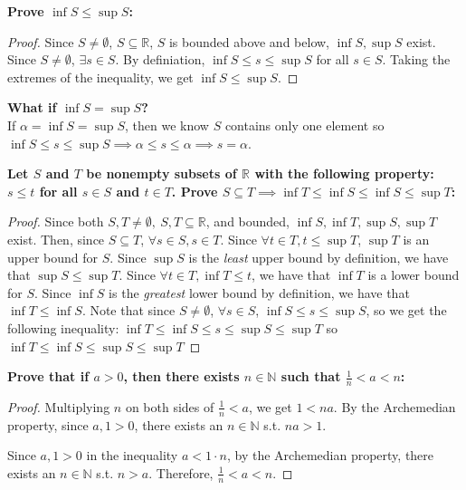 \documentclass[13pt]{letter}
\begin{document}
\textbf{Prove $\inf{S} \leq \sup{S}$:}
\begin{proof}
  Since $S \neq \emptyset$, $S \subseteq
  \mathbb{R}$, $S$ is bounded above and below, $\inf{S}, \sup{S}$
  exist. Since $S \neq \emptyset$, $\exists s \in S$. By definiation,
  $\inf{S} \leq s \leq \sup{S}$ for all $s \in S$. Taking the extremes of the
  inequality, we get $\inf{S} \leq \sup{S}$.
\end{proof}
\textbf{What if $\inf{S} = \sup{S}$?} \\
If $\alpha = \inf{S} = \sup{S}$, then we know $S$ contains only one
element so $\inf{S} \leq s \leq \sup{S} \implies \alpha \leq s \leq
\alpha \implies s = \alpha$. 

\textbf{Let $S$ and $T$ be nonempty subsets of $\mathbb{R}$ with the
  following property: $s \leq t$ for all $s \in S$ and $t \in
  T$. Prove $S \subseteq T \implies \inf{T} \leq \inf{S} \leq \inf{S} \leq \sup{T}$:}
\begin{proof}
  Since both $S, T \neq \emptyset, \ S, T \subseteq \mathbb{R}$, and
  bounded, $\inf{S}, \inf{T}, \sup{S}, \sup{T}$ exist. Then, since $S
  \subseteq T$, $\forall s \in S, s \in T$. Since $\forall t \in T, t
  \leq \sup{T}$, $\sup{T}$ is an upper bound for $S$. Since $\sup{S}$
  is the \textit{least} upper bound by definition, we have that
  $\sup{S} \leq \sup{T}$. Since $\forall t \in T, \inf{T} \leq t$, we
  have that $\inf{T}$ is a lower bound for $S$. Since $\inf{S}$ is the
  \textit{greatest} lower bound by definition, we have that $\inf{T}
  \leq \inf{S}$. Note that since $S \neq \emptyset$, $\forall s \in
  S$, $\inf{S} \leq s \leq \sup{S}$, so we get the following
  inequality: $\inf{T} \leq \inf{S} \leq s \leq \sup{S} \leq \sup{T}$
  so $\inf{T} \leq \inf{S} \leq \sup{S} \leq \sup{T}$
\end{proof}

\textbf{Prove that if $a > 0$, then there exists $n \in \mathbb{N}$
  such that $\frac{1}{n} < a < n$:}
\begin{proof}
  Multiplying $n$ on both sides of $\frac{1}{n} < a$, we get $1 <
  na$. By the Archemedian property, since $a, 1 > 0$, there exists
  an $n \in \mathbb{N}$ s.t. $na > 1$.

  Since $a, 1 > 0$ in the inequality  $a < 1 \cdot n$, by the
  Archemedian property, there exists an $n \in \mathbb{N}$ s.t. $n >
  a$. Therefore, $\frac{1}{n} < a < n$.
\end{proof}
\end{document}
